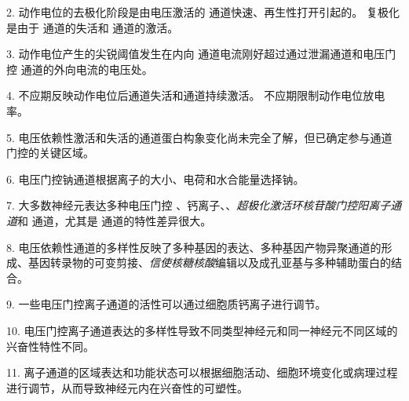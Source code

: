 2. 动作电位的去极化阶段是由电压激活的  通道快速、再生性打开引起的。
复极化是由于  通道的失活和  通道的激活。


3. 动作电位产生的尖锐阈值发生在内向  通道电流刚好超过通过泄漏通道和电压门控  通道的外向电流的电压处。


4. 不应期反映动作电位后通道失活和通道持续激活。
不应期限制动作电位放电率。


5. 电压依赖性激活和失活的通道蛋白构象变化尚未完全了解，但已确定参与通道门控的关键区域。


6. 电压门控钠通道根据离子的大小、电荷和水合能量选择钠。


7. 大多数神经元表达多种电压门控 、钙离子、、\textit{超极化激活环核苷酸门控阳离子通道}和  通道，尤其是  通道的特性差异很大。


8. 电压依赖性通道的多样性反映了多种基因的表达、多种基因产物异聚通道的形成、基因转录物的可变剪接、\textit{信使核糖核酸}编辑以及成孔亚基与多种辅助蛋白的结合。


9. 一些电压门控离子通道的活性可以通过细胞质钙离子进行调节。


10. 电压门控离子通道表达的多样性导致不同类型神经元和同一神经元不同区域的兴奋性特性不同。


11. 离子通道的区域表达和功能状态可以根据细胞活动、细胞环境变化或病理过程进行调节，从而导致神经元内在兴奋性的可塑性。


